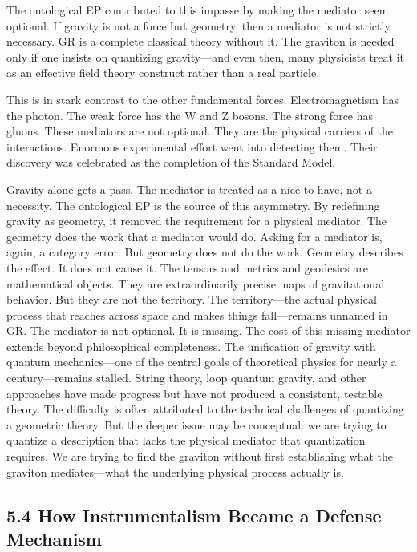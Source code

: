 \documentclass[11pt]{article}
\begin{document}
The ontological EP contributed to this impasse by making the mediator seem optional. If gravity is not a force but geometry, then a mediator is not strictly necessary. GR is a complete classical theory without it. The graviton is needed only if one insists on quantizing gravity---and even then, many physicists treat it as an effective field theory construct rather than a real particle.

This is in stark contrast to the other fundamental forces. Electromagnetism has the photon. The weak force has the W and Z bosons. The strong force has gluons. These mediators are not optional. They are the physical carriers of the interactions. Enormous experimental effort went into detecting them. Their discovery was celebrated as the completion of the Standard Model.

Gravity alone gets a pass. The mediator is treated as a nice-to-have, not a necessity. The ontological EP is the source of this asymmetry. By redefining gravity as geometry, it removed the requirement for a physical mediator. The geometry does the work that a mediator would do. Asking for a mediator is, again, a category error. But geometry does not do the work. Geometry describes the effect. It does not cause it. The tensors and metrics and geodesics are mathematical objects. They are extraordinarily precise maps of gravitational behavior. But they are not the territory. The territory---the actual physical process that reaches across space and makes things fall---remains unnamed in GR. The mediator is not optional. It is missing. The cost of this missing mediator extends beyond philosophical completeness. The unification of gravity with quantum mechanics---one of the central goals of theoretical physics for nearly a century---remains stalled. String theory, loop quantum gravity, and other approaches have made progress but have not produced a consistent, testable theory. The difficulty is often attributed to the technical challenges of quantizing a geometric theory. But the deeper issue may be conceptual: we are trying to quantize a description that lacks the physical mediator that quantization requires. We are trying to find the graviton without first establishing what the graviton mediates---what the underlying physical process actually is.

\subsection{5.4 How Instrumentalism Became a Defense Mechanism}
\end{document}
